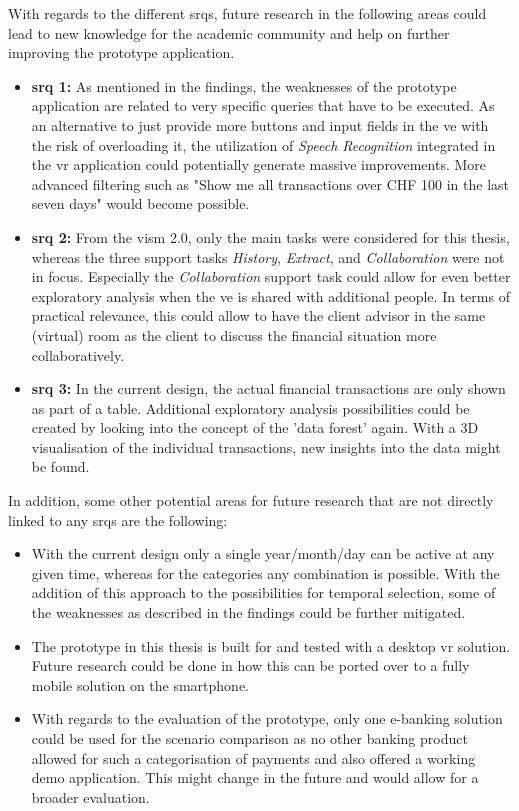 With regards to the different \glspl{srq}, future research in the following areas could lead to new knowledge for the academic community and help on further improving the prototype application.
\begin{itemize}[]
	\item \textbf{\gls{srq} 1:} As mentioned in the findings, the weaknesses of the prototype application are related to very specific queries that have to be executed. As an alternative to just provide more buttons and input fields in the \gls{ve} with the risk of overloading it, the utilization of \textit{Speech Recognition} integrated in the \gls{vr} application could potentially generate massive improvements. More advanced filtering such as "Show me all transactions over CHF 100 in the last seven days" would become possible.
	
	\item \textbf{\gls{srq} 2:} From the \gls{vism} 2.0, only the main tasks were considered for this thesis, whereas the three support tasks \textit{History}, \textit{Extract}, and \textit{Collaboration} were not in focus. Especially the \textit{Collaboration} support task could allow for even better exploratory analysis when the \gls{ve} is shared with additional people. In terms of practical relevance, this could allow to have the client advisor in the same (virtual) room as the client to discuss the financial situation more collaboratively.
	
	\item \textbf{\gls{srq} 3:} In the current design, the actual financial transactions are only shown as part of a table. Additional exploratory analysis possibilities could be created by looking into the concept of the 'data forest' again. With a 3D visualisation of the individual transactions, new insights into the data might be found.
\end{itemize}
In addition, some other potential areas for future research that are not directly linked to any \glspl{srq} are the following:
\begin{itemize}[]
	\item With the current design only a single year/month/day can be active at any given time, whereas for the categories any combination is possible. With the addition of this approach to the possibilities for temporal selection, some of the weaknesses as described in the findings could be further mitigated.
	
	\item The prototype in this thesis is built for and tested with a desktop \gls{vr} solution. Future research could be done in how this can be ported over to a fully mobile solution on the smartphone.
	
	\item With regards to the evaluation of the prototype, only one e-banking solution could be used for the scenario comparison as no other banking product allowed for such a categorisation of payments and also offered a working demo application. This might change in the future and would allow for a broader evaluation.
\end{itemize}
